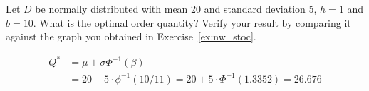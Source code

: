 \begin{question}
Let $D$ be normally distributed with mean 20 and standard deviation 5, $h=1$ and $b=10$. What is the optimal order quantity? Verify your result by comparing it against the graph you obtained in Exercise~\ref{ex:nw_stoc}. 
\end{question}

\begin{solution}
\begin{align*}
Q^* 
& = \mu + \sigma \Phi^{-1}(\beta) \\
& = 20 + 5\cdot \phi^{-1}(10/11) = 20 + 5\cdot \Phi^{-1}(1.3352) = 26.676
\end{align*}
\end{solution}



%
%
%



%
%
%
%



